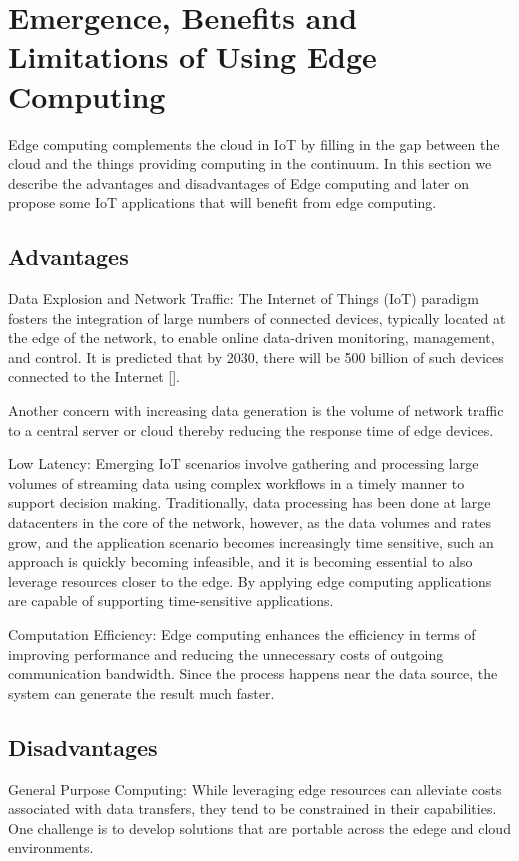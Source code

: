 \section{Emergence, Benefits and Limitations of Using Edge Computing}
Edge computing complements the cloud in IoT by filling in the gap between the cloud and the things providing computing in the continuum. In this section we describe the advantages and disadvantages of Edge computing and later on propose some IoT applications that will benefit from edge computing.

\subsection{Advantages}

Data Explosion and Network Traffic: The Internet of Things (IoT) paradigm fosters the integration of large numbers of connected devices, typically located at the edge of the network, to enable online data-driven monitoring, management, and control. It is predicted that by 2030, there will be 500 billion of such devices connected to the Internet []. 

Another concern with increasing data generation is the volume of network traffic to a central server or cloud thereby reducing the response time of edge devices.

Low Latency: Emerging IoT scenarios involve gathering and processing large volumes of streaming data using complex workflows in a timely manner to support decision making. Traditionally, data processing has been done at large datacenters in the core of the network, however, as the data volumes and rates grow, and the application scenario becomes increasingly time sensitive, such an approach is quickly becoming infeasible, and it is becoming essential to also leverage resources closer to the edge. By applying edge computing applications are capable of supporting time-sensitive applications.

Computation Efficiency: Edge computing enhances the efficiency in terms of improving performance and reducing the unnecessary costs of outgoing communication bandwidth. Since the process happens near the data source, the system can generate the result much faster.

\subsection{Disadvantages}
General Purpose Computing: While leveraging edge resources can alleviate costs associated with data transfers, they tend to be constrained in their capabilities. One challenge is to develop solutions that are portable across the edege and cloud environments.

